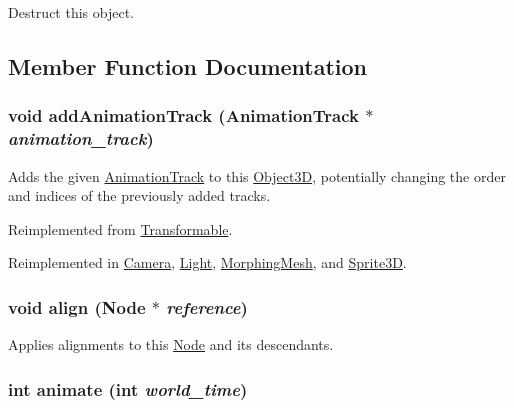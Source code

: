 Destruct this object. 

\subsection{Member Function Documentation}
\hypertarget{classm3g_1_1Node_415c0b110f95410ded9b85e5d99a496b}{
\subsubsection[{addAnimationTrack}]{\setlength{\rightskip}{0pt plus 5cm}void addAnimationTrack ({\bf AnimationTrack} $\ast$ {\em animation\_\-track})}}
\label{classm3g_1_1Node_415c0b110f95410ded9b85e5d99a496b}


Adds the given \hyperlink{classm3g_1_1AnimationTrack}{AnimationTrack} to this \hyperlink{classm3g_1_1Object3D}{Object3D}, potentially changing the order and indices of the previously added tracks. 

Reimplemented from \hyperlink{classm3g_1_1Transformable_415c0b110f95410ded9b85e5d99a496b}{Transformable}.

Reimplemented in \hyperlink{classm3g_1_1Camera_415c0b110f95410ded9b85e5d99a496b}{Camera}, \hyperlink{classm3g_1_1Light_415c0b110f95410ded9b85e5d99a496b}{Light}, \hyperlink{classm3g_1_1MorphingMesh_415c0b110f95410ded9b85e5d99a496b}{MorphingMesh}, and \hyperlink{classm3g_1_1Sprite3D_415c0b110f95410ded9b85e5d99a496b}{Sprite3D}.\hypertarget{classm3g_1_1Node_3db1b4be060fe3d4f3dbf9720ef85234}{
\subsubsection[{align}]{\setlength{\rightskip}{0pt plus 5cm}void align ({\bf Node} $\ast$ {\em reference})}}
\label{classm3g_1_1Node_3db1b4be060fe3d4f3dbf9720ef85234}


Applies alignments to this \hyperlink{classm3g_1_1Node}{Node} and its descendants. \hypertarget{classm3g_1_1Node_8aad1ceab4c2a03609c8a42324ce484d}{
\subsubsection[{animate}]{\setlength{\rightskip}{0pt plus 5cm}int animate (int {\em world\_\-time})}}
\label{classm3g_1_1Node_8aad1ceab4c2a03609c8a42324ce484d}


